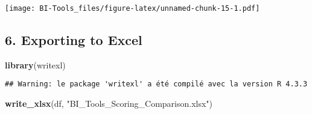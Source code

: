 \documentclass[
]{article}
\newenvironment{Shaded}{\begin{snugshade}}{\end{snugshade}}
\newcommand{\FunctionTok}[1]{\textcolor[rgb]{0.13,0.29,0.53}{\textbf{#1}}}
\newcommand{\NormalTok}[1]{#1}
\newcommand{\StringTok}[1]{\textcolor[rgb]{0.31,0.60,0.02}{#1}}
\begin{document}
\texttt{[image: BI-Tools\_files/figure-latex/unnamed-chunk-15-1.pdf]}

\subsection{6. Exporting to Excel}\label{exporting-to-excel}

\begin{Shaded}
\begin{Highlighting}[]
\FunctionTok{library}\NormalTok{(writexl)}
\end{Highlighting}
\end{Shaded}

\begin{verbatim}
## Warning: le package 'writexl' a été compilé avec la version R 4.3.3
\end{verbatim}

\begin{Shaded}
\begin{Highlighting}[]
\FunctionTok{write\_xlsx}\NormalTok{(df, }\StringTok{"BI\_Tools\_Scoring\_Comparison.xlsx"}\NormalTok{)}
\end{Highlighting}
\end{Shaded}
\end{document}

